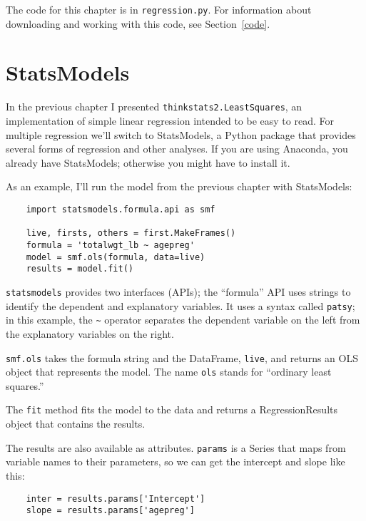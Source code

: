 \documentclass[12pt]{book}
\begin{document}
The code for this chapter is in {\tt regression.py}.  For information
about downloading and working with this code, see Section~\ref{code}.

\section{StatsModels}
\label{statsmodels}

In the previous chapter I presented {\tt thinkstats2.LeastSquares}, an
implementation of simple linear regression intended to be easy to
read.  For multiple regression we'll switch to StatsModels, a Python
package that provides several forms of regression and other
analyses.  If you are using Anaconda, you already have StatsModels;
otherwise you might have to install it.

As an example, I'll run the model from the previous chapter with
StatsModels:

\begin{verbatim}
    import statsmodels.formula.api as smf

    live, firsts, others = first.MakeFrames()
    formula = 'totalwgt_lb ~ agepreg'
    model = smf.ols(formula, data=live)
    results = model.fit()
\end{verbatim}

{\tt statsmodels} provides two interfaces (APIs); the ``formula''
API uses strings to identify the dependent and explanatory variables.
It uses a syntax called {\tt patsy}; in this example, the \verb"~"
operator separates the dependent variable on the left from the
explanatory variables on the right.

{\tt smf.ols} takes the formula string and the DataFrame, {\tt live},
and returns an OLS object that represents the model.  The name {\tt ols}
stands for ``ordinary least squares.''

The {\tt fit} method fits the model to the data and returns a
RegressionResults object that contains the results.

The results are also available as attributes.  {\tt params}
is a Series that maps from variable names to their parameters, so we can
get the intercept and slope like this:

\begin{verbatim}
    inter = results.params['Intercept']
    slope = results.params['agepreg']
\end{verbatim}
\end{document}
